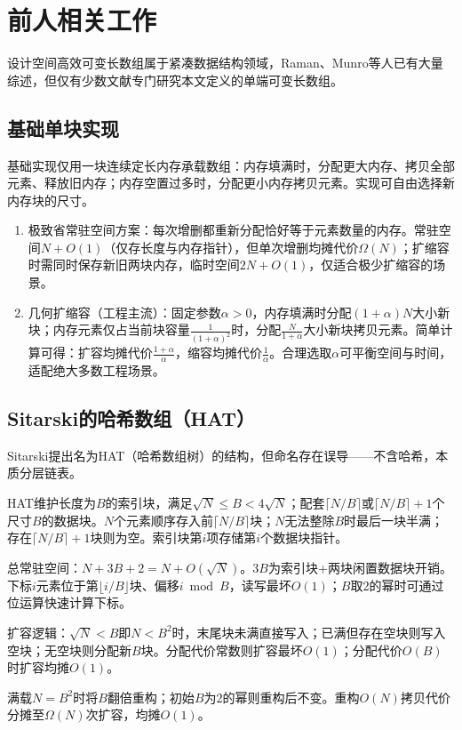 \documentclass[11pt,a4paper]{article}
\begin{document}
\section{前人相关工作}
设计空间高效可变长数组属于紧凑数据结构领域，Raman、Munro等人已有大量综述，但仅有少数文献专门研究本文定义的单端可变长数组。

\subsection{基础单块实现}
基础实现仅用一块连续定长内存承载数组：内存填满时，分配更大内存、拷贝全部元素、释放旧内存；内存空置过多时，分配更小内存拷贝元素。实现可自由选择新内存块的尺寸。
\begin{enumerate}
    \item 极致省常驻空间方案：每次增删都重新分配恰好等于元素数量的内存。常驻空间$N+O(1)$（仅存长度与内存指针），但单次增删均摊代价$\Omega(N)$；扩缩容时需同时保存新旧两块内存，临时空间$2N+O(1)$，仅适合极少扩缩容的场景。
    \item 几何扩缩容（工程主流）：固定参数$\alpha>0$，内存填满时分配$(1+\alpha)N$大小新块；内存元素仅占当前块容量$\frac{1}{(1+\alpha)^2}$时，分配$\frac{N}{1+\alpha}$大小新块拷贝元素。简单计算可得：扩容均摊代价$\frac{1+\alpha}{\alpha}$，缩容均摊代价$\frac{1}{\alpha}$。合理选取$\alpha$可平衡空间与时间，适配绝大多数工程场景。
\end{enumerate}

\subsection{Sitarski的哈希数组（HAT）}
Sitarski提出名为HAT（哈希数组树）的结构，但命名存在误导——不含哈希，本质分层链表。

HAT维护长度为$B$的索引块，满足$\sqrt{N}\le B<4\sqrt{N}$；配套$\lceil N/B\rceil$或$\lceil N/B\rceil+1$个尺寸$B$的数据块。$N$个元素顺序存入前$\lceil N/B\rceil$块；$N$无法整除$B$时最后一块半满；存在$\lceil N/B\rceil+1$块则为空。索引块第$i$项存储第$i$个数据块指针。

总常驻空间：$N+3B+2=N+O(\sqrt{N})$。$3B$为索引块+两块闲置数据块开销。下标$i$元素位于第$\lfloor i/B\rfloor$块、偏移$i\bmod B$，读写最坏$O(1)$；$B$取2的幂时可通过位运算快速计算下标。

扩容逻辑：$\sqrt{N}<B$即$N<B^2$时，末尾块未满直接写入；已满但存在空块则写入空块；无空块则分配新$B$块。分配代价常数则扩容最坏$O(1)$；分配代价$O(B)$时扩容均摊$O(1)$。

满载$N=B^2$时将$B$翻倍重构；初始$B$为2的幂则重构后不变。重构$O(N)$拷贝代价分摊至$\Omega(N)$次扩容，均摊$O(1)$。
\end{document}
